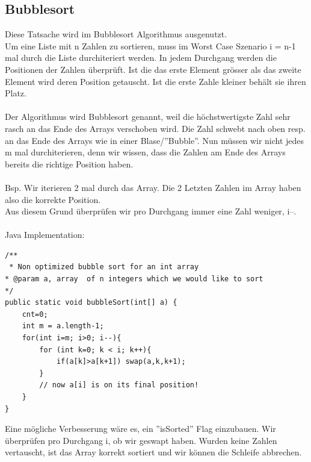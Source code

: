 \documentclass[a4paper,10pt]{report}
\begin{document}
\subsection{Bubblesort}
Diese Tatsache wird im Bubblesort Algorithmus ausgenutzt.\\
Um eine Liste mit n Zahlen zu sortieren, muss im Worst Case Szenario i = n-1 mal durch die Liste durchiteriert werden. In jedem Durchgang werden die Positionen der Zahlen überprüft. Ist die das erste Element grösser als das zweite Element wird deren Position getauscht. Ist die erste Zahle kleiner behält sie ihren Platz.\\
\\Der Algorithmus wird  Bubblesort genannt, weil die höchstwertigste Zahl sehr rasch an das Ende des Arrays  verschoben wird. Die Zahl schwebt nach oben resp. an das Ende des Arrays wie in einer Blase/''Bubble''. Nun müssen wir nicht jedes m mal durchiterieren, denn wir wissen, dass die Zahlen am Ende des Arrays bereits die richtige Position haben. 
\\
\\Bsp. Wir iterieren 2 mal durch das Array. Die 2 Letzten Zahlen im Array haben also die korrekte Position.\\
Aus diesem Grund überprüfen wir pro Durchgang immer eine Zahl weniger, i--.\\
\\
Java Implementation:
\begin{lstlisting}
/**
 * Non optimized bubble sort for an int array 
* @param a, array  of n integers which we would like to sort
*/
public static void bubbleSort(int[] a) {
	cnt=0;
	int m = a.length-1;
	for(int i=m; i>0; i--){ 
		for (int k=0; k < i; k++){
			if(a[k]>a[k+1]) swap(a,k,k+1);
		}
		// now a[i] is on its final position!
	}
}
\end{lstlisting}
Eine mögliche Verbesserung wäre es, ein ''isSorted'' Flag einzubauen. Wir überprüfen pro Durchgang i, ob wir geswapt haben. Wurden keine Zahlen vertauscht, ist das Array korrekt sortiert und wir können die Schleife abbrechen.
\newpage
\noindent
\end{document}
